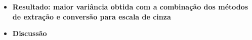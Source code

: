 \begin{itemize}
%

\item[] \textbf{Resultado: maior variância obtida com a combinação dos métodos de extração e conversão para escala de cinza}

\item[] \textbf{Discussão}

\end{itemize}

